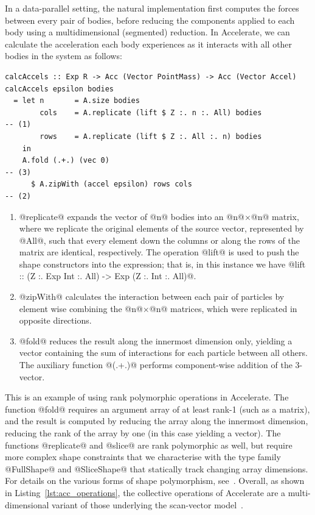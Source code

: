 In a data-parallel setting, the natural implementation first computes the forces
between every pair of bodies, before reducing the components applied to each
body using a multidimensional (segmented) reduction. In Accelerate, we can calculate
the acceleration each body experiences as it interacts with all other bodies in
the system as follows:
%
\begin{lstlisting}[style=haskell]
calcAccels :: Exp R -> Acc (Vector PointMass) -> Acc (Vector Accel)
calcAccels epsilon bodies
  = let n       = A.size bodies
        cols    = A.replicate (lift $ Z :. n :. All) bodies                        -- (1)
        rows    = A.replicate (lift $ Z :. All :. n) bodies
    in
    A.fold (.+.) (vec 0)                                                           -- (3)
      $ A.zipWith (accel epsilon) rows cols                                        -- (2)
\end{lstlisting}
%
\begin{enumerate}
\item @replicate@ expands the vector of @n@ bodies into an @n@$\times$@n@
    matrix, where we replicate the original elements of the source vector,
    represented by @All@, such that every element down the columns or along the
    rows of the matrix are identical, respectively. The operation @lift@ is used
    to push the shape constructors into the expression; that is, in this
    instance we have @lift :: (Z :. Exp Int :. All) -> Exp (Z :. Int :. All)@.

\item @zipWith@ calculates the interaction between each pair of particles by
    element wise combining the @n@$\times$@n@ matrices, which were replicated in
    opposite directions.

\item @fold@ reduces the result along the innermost dimension only, yielding a
    vector containing the sum of interactions for each particle between all
    others. The auxiliary function @(.+.)@ performs component-wise addition of
    the 3-vector.
\end{enumerate}

This is an example of using rank polymorphic operations in Accelerate. The
function @fold@ requires an argument array of at least rank-1 (such as a
matrix), and the result is computed by reducing the array along the innermost
dimension, reducing the rank of the array by one (in this case yielding a
vector). The functions @replicate@ and @slice@ are rank polymorphic as well, but
require more complex shape constraints that we characterise with the type family
@FullShape@ and @SliceShape@ that statically track changing array dimensions.
For details on the various forms of shape polymorphism,
see~\cite{Keller:2010er}. Overall, as shown in Listing~\ref{lst:acc_operations},
the collective operations of Accelerate are a multi-dimensional variant of those
underlying the scan-vector model~\cite{Chatterjee:1990vj,Sengupta:2007tc}.


